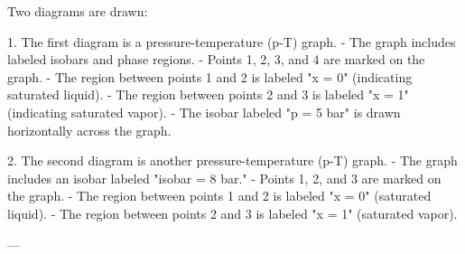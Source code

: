 Two diagrams are drawn:  

1. The first diagram is a pressure-temperature (p-T) graph.  
   - The graph includes labeled isobars and phase regions.  
   - Points 1, 2, 3, and 4 are marked on the graph.  
   - The region between points 1 and 2 is labeled "x = 0" (indicating saturated liquid).  
   - The region between points 2 and 3 is labeled "x = 1" (indicating saturated vapor).  
   - The isobar labeled "p = 5 bar" is drawn horizontally across the graph.  

2. The second diagram is another pressure-temperature (p-T) graph.  
   - The graph includes an isobar labeled "isobar = 8 bar."  
   - Points 1, 2, and 3 are marked on the graph.  
   - The region between points 1 and 2 is labeled "x = 0" (saturated liquid).  
   - The region between points 2 and 3 is labeled "x = 1" (saturated vapor).  

---